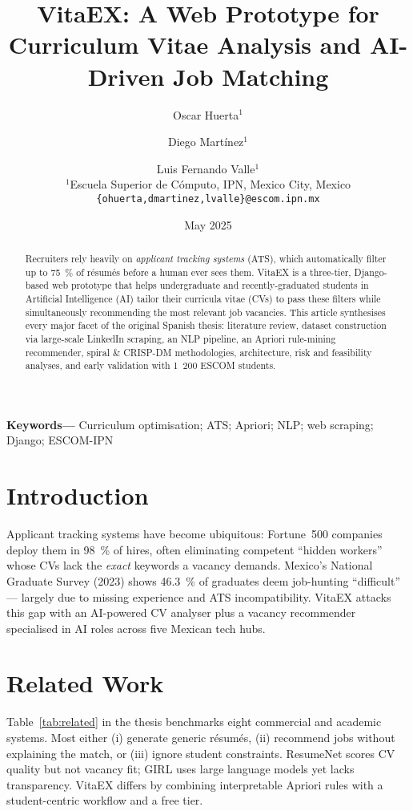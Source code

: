 \documentclass[12pt,a4paper]{article}
\title{VitaEX: A Web Prototype for Curriculum Vitae Analysis and AI-Driven Job Matching}
\author{Oscar Huerta$^1$ \and Diego Martínez$^1$ \and Luis Fernando Valle$^1$ \\ $^1$Escuela Superior de Cómputo, IPN, Mexico City, Mexico \\ \texttt{\{ohuerta,dmartinez,lvalle\}@escom.ipn.mx}}
\date{May 2025}
\begin{document}
	\maketitle
	
	\begin{abstract}
		Recruiters rely heavily on \emph{applicant tracking systems} (ATS), which automatically filter up to 75~\% of résumés before a human ever sees them. VitaEX is a three-tier, Django-based web prototype that helps undergraduate and recently-graduated students in Artificial Intelligence (AI) tailor their curricula vitae (CVs) to pass these filters while simultaneously recommending the most relevant job vacancies. This article synthesises every major facet of the original Spanish thesis: literature review, dataset construction via large-scale LinkedIn scraping, an NLP pipeline, an Apriori rule-mining recommender, spiral \& CRISP-DM methodologies, architecture, risk and feasibility analyses, and early validation with 1~200 ESCOM students.
	\end{abstract}
	
	\textbf{Keywords—} Curriculum optimisation; ATS; Apriori; NLP; web scraping; Django; ESCOM-IPN
	
	\section{Introduction}
	Applicant tracking systems have become ubiquitous: Fortune~500 companies deploy them in 98~\% of hires, often eliminating competent “hidden workers” whose CVs lack the \emph{exact} keywords a vacancy demands. Mexico’s National Graduate Survey (2023) shows 46.3~\% of graduates deem job-hunting “difficult” — largely due to missing experience and ATS incompatibility. VitaEX attacks this gap with an AI-powered CV analyser plus a vacancy recommender specialised in AI roles across five Mexican tech hubs.
	
	\section{Related Work}
	Table~\ref{tab:related} in the thesis benchmarks eight commercial and academic systems. Most either (i) generate generic résumés, (ii) recommend jobs without explaining the match, or (iii) ignore student constraints. ResumeNet\cite{resumenet} scores CV quality but not vacancy fit; GIRL\cite{girl} uses large language models yet lacks transparency. VitaEX differs by combining interpretable Apriori rules with a student-centric workflow and a free tier.
	
\end{document}
